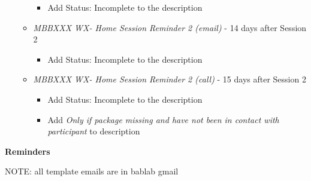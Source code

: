 \documentclass[]{book}
\providecommand{\tightlist}{%
  \setlength{\itemsep}{0pt}\setlength{\parskip}{0pt}}
\begin{document}
\begin{itemize}
\begin{itemize}
    \begin{itemize}
    \tightlist
    \item
      Add Status: Incomplete to the description
    \end{itemize}
  \item
    \emph{MBBXXX WX- Home Session Reminder 2 (email)} - 14 days after Session 2

    \begin{itemize}
    \tightlist
    \item
      Add Status: Incomplete to the description
    \end{itemize}
  \item
    \emph{MBBXXX WX- Home Session Reminder 2 (call)} - 15 days after Session 2

    \begin{itemize}
    \tightlist
    \item
      Add Status: Incomplete to the description
    \item
      Add \emph{Only if package missing and have not been in contact with participant} to description
    \end{itemize}
  \end{itemize}
\end{itemize}

\textbf{Reminders}

NOTE: all template emails are in bablab gmail
\end{document}
